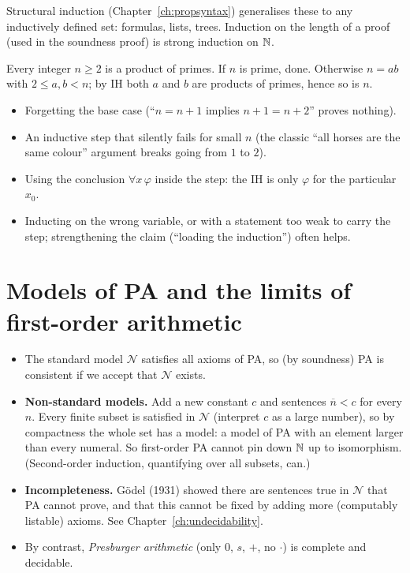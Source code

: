 Structural induction (Chapter~\ref{ch:propsyntax}) generalises these to any inductively
defined set: formulas, lists, trees. Induction on the length of a proof (used in the
soundness proof) is strong induction on $\mathbb{N}$.

\begin{example}
Every integer $n\ge2$ is a product of primes. If $n$ is prime, done. Otherwise $n=ab$ with
$2\le a,b<n$; by IH both $a$ and $b$ are products of primes, hence so is $n$.
\end{example}

\begin{important}
\begin{itemize}
  \item Forgetting the base case (``$n=n+1$ implies $n+1=n+2$'' proves nothing).
  \item An inductive step that silently fails for small $n$ (the classic ``all horses are
        the same colour'' argument breaks going from $1$ to $2$).
  \item Using the conclusion $\forall x\,\varphi$ inside the step: the IH is only
        $\varphi$ for the particular $x_0$.
  \item Inducting on the wrong variable, or with a statement too weak to carry the step;
        strengthening the claim (``loading the induction'') often helps.
\end{itemize}
\end{important}

\section{Models of PA and the limits of first-order arithmetic}

\begin{itemize}
  \item The standard model $\mathcal{N}$ satisfies all axioms of PA, so (by soundness)
        PA is consistent if we accept that $\mathcal{N}$ exists.
  \item \textbf{Non-standard models.} Add a new constant $c$ and sentences
        $\overline{n}<c$ for every $n$. Every finite subset is satisfied in $\mathcal{N}$
        (interpret $c$ as a large number), so by compactness the whole set has a model:
        a model of PA with an element larger than every numeral. So first-order PA cannot
        pin down $\mathbb{N}$ up to isomorphism. (Second-order induction, quantifying over all
        subsets, can.)
  \item \textbf{Incompleteness.} G\"odel (1931) showed there are sentences true in
        $\mathcal{N}$ that PA cannot prove, and that this cannot be fixed by adding more
        (computably listable) axioms. See Chapter~\ref{ch:undecidability}.
  \item By contrast, \emph{Presburger arithmetic} (only $0$, $s$, $+$, no $\cdot$) is
        complete and decidable.
\end{itemize}

